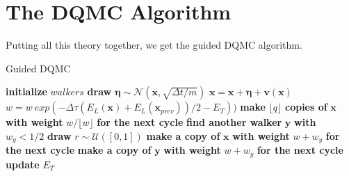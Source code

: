 \documentclass [12pt]{report}
\begin{document}
\section{The DQMC Algorithm}
Putting all this theory together, we get the guided DQMC algorithm.
\begin{algorithm}
\caption{Guided DQMC}\label{dqmc}
\begin{algorithmic}[1]
\State \textbf{initialize} $walkers$
		\State \textbf{draw} $\bm{\eta} \sim \mathcal{N}(\bm{x},\sqrt{\Delta t/m})$
		\State $\bm{x} = \bm{x} + \bm{\eta} + \bm{v}(\bm{x})$ 
		\State $w = w \: exp(-\Delta \tau (E_L(\bm{x})+E_L(\bm{x}_{prev}))/2 - E_T))$
		\State \textbf{make} $\lfloor q \rfloor$ \textbf{copies of} $\bm{x}$ \textbf{with weight} $w/\lfloor w \rfloor$ \textbf{for the next cycle}
		\EndIf
		\State \textbf{find another walker} $\bm{y}$ \textbf{with} $w_y < 1/2$
		\State \textbf{draw} $r \sim \mathcal{U}([0,1])$
		\State \textbf{make a copy of} $\bm{x}$ \textbf{with weight} $w+w_y$ \textbf{for the next cycle}
		\Else
		\State \textbf{make a copy of} $\bm{y}$ \textbf{with weight} $w+w_y$ \textbf{for the next cycle}
		\EndIf
		\EndIf 
	\EndFor
	\State \textbf{update} $E_T$ 
\EndFor 
\EndProcedure
\end{algorithmic}
\end{algorithm}
\newpage
\end{document}

